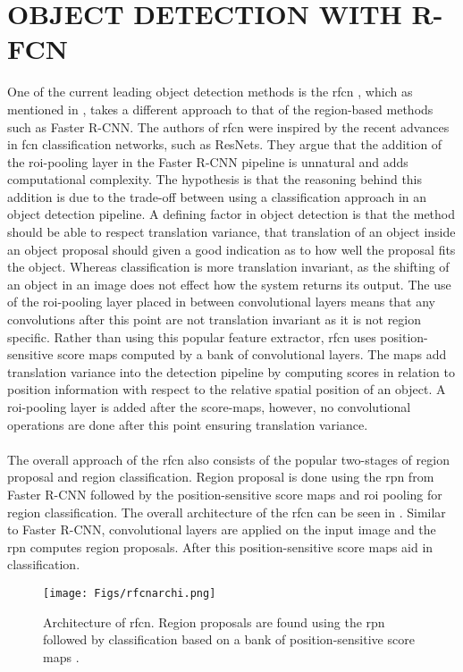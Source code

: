 \documentclass[a4paper,twoside]{article}
\begin{document}
\section{\uppercase{Object Detection with R-FCN}}
One of the current leading object detection methods is the \gls{rfcn} \cite{rfcn}, which as mentioned in , takes a different approach to that of the region-based methods such as Faster R-CNN. The authors of \gls{rfcn} were inspired by the recent advances in \gls{fcn} classification networks, such as ResNets. They argue that the addition of the \gls{roi}-pooling layer in the Faster R-CNN pipeline is unnatural and adds computational complexity. The hypothesis is that the reasoning behind this addition is due to the trade-off between using a classification approach in an object detection pipeline. A defining factor in object detection is that the method should be able to respect translation variance, that translation of an object inside an object proposal should given a good indication as to how well the proposal fits the object. Whereas classification is more translation invariant, as the shifting of an object in an image does not effect how the system returns its output. The use of the \gls{roi}-pooling layer placed in between convolutional layers means that any convolutions after this point are not translation invariant as it is not region specific. Rather than using this popular feature extractor, \gls{rfcn} uses position-sensitive score maps computed by a bank of convolutional layers. The maps add translation variance into the detection pipeline by computing scores in relation to position information with respect to the relative spatial position of an object. A \gls{roi}-pooling layer is added after the score-maps, however, no convolutional operations are done after this point ensuring translation variance.
\\\\
The overall approach of the \gls{rfcn} also consists of the popular two-stages of region proposal and region classification. Region proposal is done using the \gls{rpn} from Faster R-CNN followed by the position-sensitive score maps and \gls{roi} pooling for region classification. The overall architecture of the \gls{rfcn} can be seen in . Similar to Faster R-CNN, convolutional layers are applied on the input image and the \gls{rpn} computes region proposals. After this position-sensitive score maps aid in classification.


\begin{figure}[H]
  \centering
    \texttt{[image: Figs/rfcnarchi.png]}
      \caption{Architecture of \gls{rfcn}. Region proposals are found using the \gls{rpn} followed by classification based on a bank of position-sensitive score maps \cite{rfcn}.}
    \label{fig:rfcnarch}
\end{figure}
\end{document}
